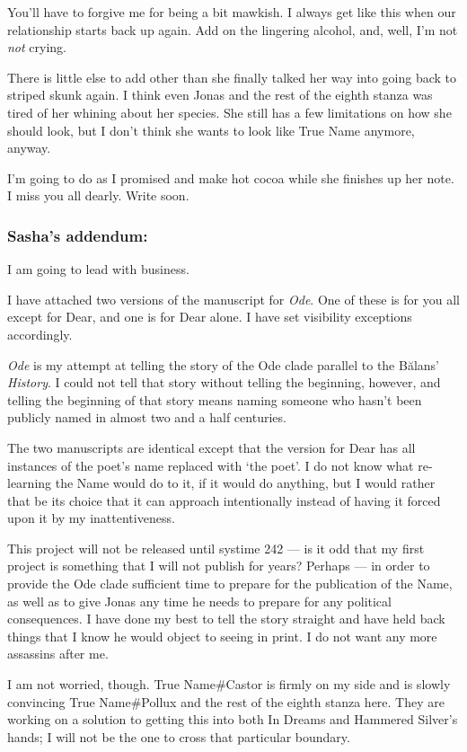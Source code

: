 You'll have to forgive me for being a bit mawkish. I always get like this when our relationship starts back up again. Add on the lingering alcohol, and, well, I'm not \emph{not} crying.

There is little else to add other than she finally talked her way into going back to striped skunk again. I think even Jonas and the rest of the eighth stanza was tired of her whining about her species. She still has a few limitations on how she should look, but I don't think she wants to look like True Name anymore, anyway.

I'm going to do as I promised and make hot cocoa while she finishes up her note. I miss you all dearly. Write soon.

\hypertarget{sashas-addendum}{%
\subsubsection{Sasha's addendum:}\label{sashas-addendum}}

I am going to lead with business.

I have attached two versions of the manuscript for \emph{Ode}. One of these is for you all except for Dear, and one is for Dear alone. I have set visibility exceptions accordingly.

\emph{Ode} is my attempt at telling the story of the Ode clade parallel to the Bălans' \emph{History}. I could not tell that story without telling the beginning, however, and telling the beginning of that story means naming someone who hasn't been publicly named in almost two and a half centuries.

The two manuscripts are identical except that the version for Dear has all instances of the poet's name replaced with `the poet'. I do not know what re-learning the Name would do to it, if it would do anything, but I would rather that be its choice that it can approach intentionally instead of having it forced upon it by my inattentiveness.

This project will not be released until systime 242 — is it odd that my first project is something that I will not publish for years? Perhaps — in order to provide the Ode clade sufficient time to prepare for the publication of the Name, as well as to give Jonas any time he needs to prepare for any political consequences. I have done my best to tell the story straight and have held back things that I know he would object to seeing in print. I do not want any more assassins after me.

I am not worried, though. True Name\#Castor is firmly on my side and is slowly convincing True Name\#Pollux and the rest of the eighth stanza here. They are working on a solution to getting this into both In Dreams and Hammered Silver's hands; I will not be the one to cross that particular boundary.

